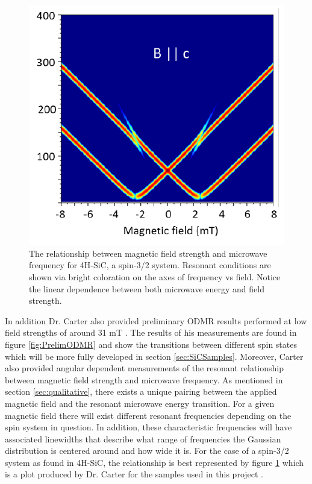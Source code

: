 \documentclass[oneside, noacknowlegments]{BYUPhys}
\begin{document}
\begin{figure}
    \centerline{\includegraphics{MFRelationship_fig}}
    \caption[Magnetic Field and Microwave Frequency Relationship]{\label{fig:MFRelationship}
     The relationship between magnetic field strength and microwave frequency for 4H-SiC, a spin-3/2 system. Resonant conditions are shown via bright coloration on the axes of frequency vs field. Notice the linear dependence between both microwave energy and field strength.}
 \end{figure}

In addition Dr. Carter also provided preliminary ODMR results performed at low field strengths of around 31 mT \cite{RefWorks:doc:5892964ee4b0499fa95c5108}. The results of his measurements are found in figure \ref{fig:PrelimODMR} and show the transitions between different spin states which will be more fully developed in section \ref{sec:SiCSamples}. Moreover, Carter also provided angular dependent measurements of the resonant relationship between magnetic field strength and microwave frequency. As mentioned in section \ref{sec:qualitative}, there exists a unique pairing between the applied magnetic field and the resonant microwave energy transition. For a given magnetic field there will exist different resonant frequencies depending on the spin system in question. In addition, these characteristic frequencies will have associated linewidths that describe what range of frequencies the Gaussian distribution is centered around and how wide it is. For the case of a spin-3/2 system as found in 4H-SiC, the relationship is best represented by figure \ref{fig:MFRelationship} which is a plot produced by Dr. Carter for the samples used in this project \cite{RefWorks:doc:5892964ee4b0499fa95c5108}.
 
\end{document}
